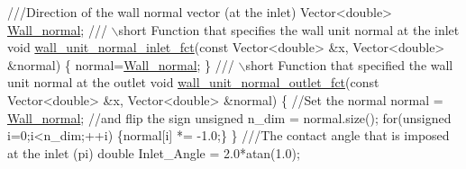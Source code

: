  
\begin{DoxyCodeInclude}
 \textcolor{comment}{///Direction of the wall normal vector (at the inlet)}
 Vector<double> \hyperlink{namespaceGlobal__Physical__Variables_a5feb3df21fc4a0adefadecb8a8ed98d7}{Wall\_normal};
\textcolor{comment}{}
\textcolor{comment}{ /// \(\backslash\)short Function that specifies the wall unit normal at the inlet}
\textcolor{comment}{} \textcolor{keywordtype}{void} \hyperlink{namespaceGlobal__Physical__Variables_aa26e74c1f9f93f8212e45380f55fb562}{wall\_unit\_normal\_inlet\_fct}(\textcolor{keyword}{const} Vector<double> &x, 
                                 Vector<double> &normal)
 \{
  normal=\hyperlink{namespaceGlobal__Physical__Variables_a5feb3df21fc4a0adefadecb8a8ed98d7}{Wall\_normal};
 \}
\textcolor{comment}{}
\textcolor{comment}{ /// \(\backslash\)short Function that specified the wall unit normal at the outlet}
\textcolor{comment}{} \textcolor{keywordtype}{void} \hyperlink{namespaceGlobal__Physical__Variables_a8ab8f6e823e4cd204ed7264121a42bfb}{wall\_unit\_normal\_outlet\_fct}(\textcolor{keyword}{const} Vector<double> &x, 
                                 Vector<double> &normal)
 \{
  \textcolor{comment}{//Set the normal}
  normal = \hyperlink{namespaceGlobal__Physical__Variables_a5feb3df21fc4a0adefadecb8a8ed98d7}{Wall\_normal};
  \textcolor{comment}{//and flip the sign}
  \textcolor{keywordtype}{unsigned} n\_dim = normal.size();
  \textcolor{keywordflow}{for}(\textcolor{keywordtype}{unsigned} i=0;i<n\_dim;++i) \{normal[i] *= -1.0;\}
 \}
\textcolor{comment}{}
\textcolor{comment}{ ///The contact angle that is imposed at the inlet (pi)}
\textcolor{comment}{} \textcolor{keywordtype}{double} Inlet\_Angle = 2.0*atan(1.0);

\end{DoxyCodeInclude}




 

